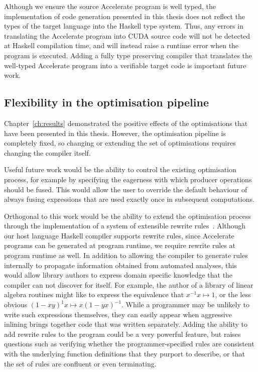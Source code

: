 Although we ensure the source Accelerate program is well typed, the
implementation of code generation presented in this thesis does not reflect the
types of the target language into the Haskell type system. Thus, any errors in
translating the Accelerate program into CUDA source code will not be detected at
Haskell compilation time, and will instead raise a runtime error when the
program is executed. Adding a fully type preserving compiler that translates the
well-typed Accelerate program into a verifiable target code is important future
work.


\subsection{Flexibility in the optimisation pipeline}

Chapter~\ref{ch:results} demonstrated the positive effects of the optimisations
that have been presented in this thesis. However, the optimisation pipeline is
completely fixed, so changing or extending the set of optimisations requires
changing the compiler itself.

Useful future work would be the ability to control the existing optimisation
process, for example by specifying the eagerness with which producer operations
should be fused. This would allow the user to override the default behaviour of
always fusing expressions that are used exactly once in subsequent computations.

Orthogonal to this work would be the ability to extend the optimisation process
through the implementation of a system of extensible rewrite
rules~\cite{Jones:2001wm}. Although our host language Haskell compiler supports
rewrite rules, since Accelerate programs can be generated at program runtime, we
require rewrite rules at program runtime as well. In addition to allowing the
compiler to generate rules internally to propagate information obtained from
automated analyses, this would allow library authors to express domain specific
knowledge that the compiler can not discover for itself. For example, the author
of a library of linear algebra routines might like to express the equivalence
that $x^{-1}x \mapsto 1$, or the less obvious $\left( 1 - x y \right)^{1}x
\mapsto x \left( 1 - y x \right)^{-1}$. While a programmer may be unlikely to
write such expressions themselves, they can easily appear when aggressive
inlining brings together code that was written separately. Adding the ability to
add rewrite rules to the program could be a very powerful feature, but raises
questions such as verifying whether the programmer-specified rules are
consistent with the underlying function definitions that they purport to
describe, or that the set of rules are confluent or even terminating.


